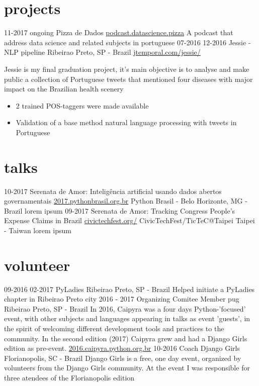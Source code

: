 \documentclass[]{friggeri-cv}
\begin{document}
\section{projects}

\begin{entrylist}
  \entry
    {11-2017 ongoing}
    {Pizza de Dados}
    {\href{http://podcast.datascience.pizza/}{podcast.datascience.pizza}}
    {A podcast that address data science and related subjects in portuguese}
  \entrysecondtype
    {07-2016 12-2016}
    {Jessie - NLP pipeline}
    {Ribeirao Preto, SP - Brazil}
    {\href{http://jtemporal.com/jessie/}{jtemporal.com/jessie/}}
    {Jessie is my final graduation project, it's main objective is to analyse and make public a collection of Portuguese tweets that mentioned four diseases with major impact on the Brazilian health scenery
      \begin{itemize}
        \item 2 trained POS-taggers were made available
        \item Validation of a base method natural language processing with tweets in Portuguese
      \end{itemize}
    }
\end{entrylist}

\section{talks}

\begin{entrylist}
  \talkentry
    {10-2017}
    {Serenata de Amor: Inteligência artificial usando dados abertos governamentais}
    {\href{http://2017.pythonbrasil.org.br/}{2017.pythonbrasil.org.br}}
    {Python Brasil - Belo Horizonte, MG - Brazil}
    {lorem ipsum}
  \talkentry
    {09-2017}
    {Serenata de Amor: Tracking Congress People's Expense Claims in Brazil}
    {\href{http://civictechfest.org/}{civictechfest.org/}}
    {CivicTechFest/TicTeC@Taipei Taipei - Taiwan}
    {lorem ipsum}
\end{entrylist}

\section{volunteer}

\begin{entrylist}
  \entry
    {09-2016 02-2017}
    {PyLadies}
    {Ribeirao Preto, SP - Brazil}
    {Helped initiate a PyLadies chapter in Ribeirao Preto city}
  \entry
    {2016 - 2017}
    {Organizing Comitee Member}
    {pug Ribeirao Preto, SP - Brazil}
    {In 2016, Caipyra was a four days Python-'focused' event, with other subjects and languages appearing in talks as event 'guests', in the spirit of welcoming different development tools and practices to the community. In the second edition (2017) Caipyra grew and had a Django Girls edition as pre-event. \footnotesize\href{2016.caipyra.python.org.br}{2016.caipyra.python.org.br}}
  \entry
    {10-2016}
    {Coach}
    {Django Girls Florianopolis, SC - Brazil}
    {Django Girls is a free, one day event, organized by volunteers  from the Django Girls community. At the event I was responsible for three atendees of the Florianopolis edition}
\end{entrylist}
\end{document}
